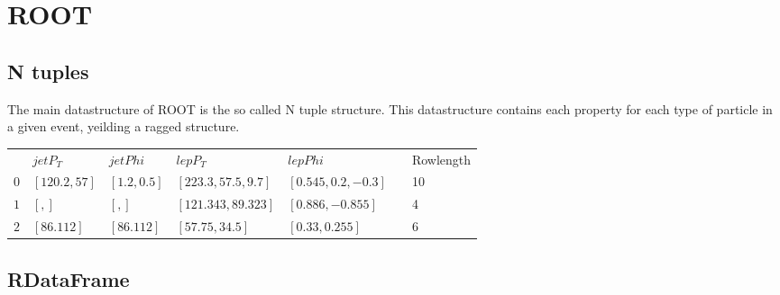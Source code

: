\section{ROOT}

\subsection*{N tuples}

The main datastructure of ROOT is the so called N tuple structure. This datastructure contains each property for each type of particle in a given event, yeilding
a ragged structure. 

\begin{table}[H]
    \begin{tabular}{|l|l|l|l|l|l|l|}
    \cline{1-5} \cline{7-7}
        & $jetP_T$      & $jetPhi$     & $lepP_T$             & $lepPhi$             &  & Rowlength \\ \cline{1-5} \cline{7-7} 
    $0$ & $[120.2, 57]$ & $[1.2, 0.5]$ & $[223.3, 57.5, 9.7]$ & $[0.545, 0.2, -0.3]$ &  & 10        \\ \cline{1-5} \cline{7-7} 
    $1$ & $[, ]$          & $[, ]$         & $[121.343, 89.323]$  & $[0.886, -0.855]$    &  & 4         \\ \cline{1-5} \cline{7-7} 
    $2$ & $[86.112]$    & $[86.112]$   & $[57.75, 34.5]$      & $[0.33, 0.255]$      &  & 6         \\ \cline{1-5} \cline{7-7} 
    \end{tabular}
\end{table}

\subsection*{RDataFrame}

\cite{Manca:2694107}

